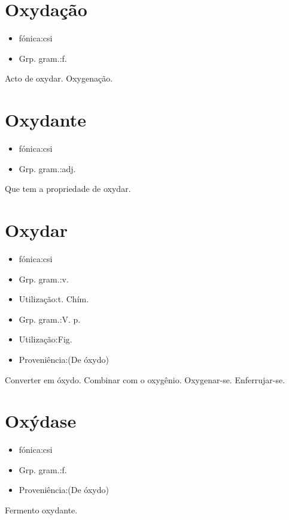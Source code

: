 \section{Oxydação}
\begin{itemize}
\item {fónica:csi}
\end{itemize}
\begin{itemize}
\item {Grp. gram.:f.}
\end{itemize}
Acto de oxydar.
Oxygenação.
\section{Oxydante}
\begin{itemize}
\item {fónica:csi}
\end{itemize}
\begin{itemize}
\item {Grp. gram.:adj.}
\end{itemize}
Que tem a propriedade de oxydar.
\section{Oxydar}
\begin{itemize}
\item {fónica:csi}
\end{itemize}
\begin{itemize}
\item {Grp. gram.:v.}
\end{itemize}
\begin{itemize}
\item {Utilização:t. Chím.}
\end{itemize}
\begin{itemize}
\item {Grp. gram.:V. p.}
\end{itemize}
\begin{itemize}
\item {Utilização:Fig.}
\end{itemize}
\begin{itemize}
\item {Proveniência:(De \textunderscore óxydo\textunderscore )}
\end{itemize}
Converter em óxydo.
Combinar com o oxygênio.
Oxygenar-se.
Enferrujar-se.
\section{Oxýdase}
\begin{itemize}
\item {fónica:csi}
\end{itemize}
\begin{itemize}
\item {Grp. gram.:f.}
\end{itemize}
\begin{itemize}
\item {Proveniência:(De \textunderscore óxydo\textunderscore )}
\end{itemize}
Fermento oxydante.
